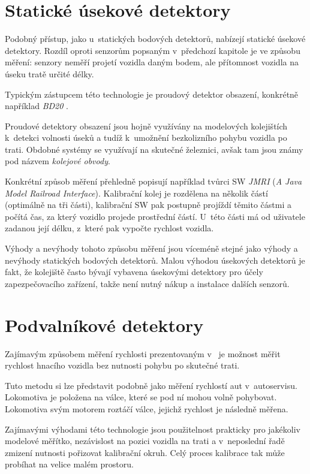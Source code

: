 \section{Statické úsekové detektory}

Podobný přístup, jako u~statických bodových detektorů, nabízejí statické
úsekové detektory. Rozdíl oproti senzorům popsaným v~předchozí kapitole je
ve způsobu měření: senzory neměří projetí vozidla daným bodem, ale přítomnost
vozidla na úseku tratě určité délky.

Typickým zástupcem této technologie je proudový detektor obsazení, konkrétně
například \textit{BD20} \cite{bd20}.

Proudové detektory obsazení jsou hojně využívány na modelových kolejištích k~detekci
volnosti úseků a tudíž k~umožnění bezkolizního pohybu vozidla po trati.
Obdobné systémy se využívají na skutečné železnici, avšak tam jsou známy pod
názvem \textit{kolejové obvody}.

Konkrétní způsob měření přehledně popisují například tvůrci SW \textit{JMRI}
\cite{jmri:speedometer} (\textit{A Java Model Railroad Interface}).
Kalibrační kolej je rozdělena na několik částí (optimálně na tři části), kalibrační
SW pak postupně projíždí těmito částmi a počítá čas, za který vozidlo projede
prostřední částí. U~této části má od uživatele zadanou její délku, z~které pak
vypočte rychlost vozidla.

Výhody a nevýhody tohoto způsobu měření jsou víceméně stejné jako výhody a
nevýhody statických bodových detektorů. Malou výhodou úsekových detektorů je
fakt, že kolejiště často bývají vybavena úsekovými detektory pro účely
zapezpečovacího zařízení, takže není nutný nákup a instalace dalších senzorů.

\section{Podvalníkové detektory}

Zajímavým způsobem měření rychlosti prezentovaným v~\cite{bachrus}
je možnost měřit rychlost hnacího vozidla bez nutnosti pohybu po skutečné trati.

Tuto metodu si lze představit podobně jako měření rychlostí aut v~autoservisu.
Lokomotiva je položena na válce, které se pod ní mohou volně pohybovat.
Lokomotiva svým motorem roztáčí válce, jejichž rychlost je následně měřena.

Zajímavými výhodami této technologie jsou použitelnost prakticky pro jakékoliv
modelové měřítko, nezávislost na pozici vozidla na trati a v~neposlední řadě
zmizení nutnosti pořizovat kalibrační okruh. Celý proces kalibrace tak může
probíhat na velice malém prostoru.

